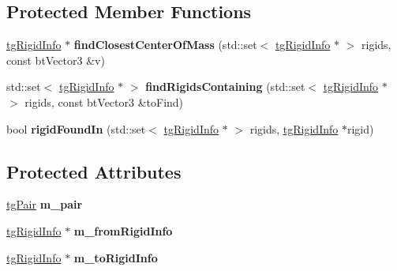 \subsection*{Protected Member Functions}
\begin{DoxyCompactItemize}
\item 
\hypertarget{classtg_connector_info_ae4cc2bb42c711b84030de8aa85c62914}{\hyperlink{classtg_rigid_info}{tg\-Rigid\-Info} $\ast$ {\bfseries find\-Closest\-Center\-Of\-Mass} (std\-::set$<$ \hyperlink{classtg_rigid_info}{tg\-Rigid\-Info} $\ast$ $>$ rigids, const bt\-Vector3 \&v)}\label{classtg_connector_info_ae4cc2bb42c711b84030de8aa85c62914}

\item 
\hypertarget{classtg_connector_info_a846dd3e81da5a535df56b1adcf1a22c4}{std\-::set$<$ \hyperlink{classtg_rigid_info}{tg\-Rigid\-Info} $\ast$ $>$ {\bfseries find\-Rigids\-Containing} (std\-::set$<$ \hyperlink{classtg_rigid_info}{tg\-Rigid\-Info} $\ast$ $>$ rigids, const bt\-Vector3 \&to\-Find)}\label{classtg_connector_info_a846dd3e81da5a535df56b1adcf1a22c4}

\item 
\hypertarget{classtg_connector_info_a5c509a7fa18968d5f2cd4e5d85fde970}{bool {\bfseries rigid\-Found\-In} (std\-::set$<$ \hyperlink{classtg_rigid_info}{tg\-Rigid\-Info} $\ast$ $>$ rigids, \hyperlink{classtg_rigid_info}{tg\-Rigid\-Info} $\ast$rigid)}\label{classtg_connector_info_a5c509a7fa18968d5f2cd4e5d85fde970}

\end{DoxyCompactItemize}
\subsection*{Protected Attributes}
\begin{DoxyCompactItemize}
\item 
\hypertarget{classtg_connector_info_a84094c60d574b1a4d433befeabf066d1}{\hyperlink{classtg_pair}{tg\-Pair} {\bfseries m\-\_\-pair}}\label{classtg_connector_info_a84094c60d574b1a4d433befeabf066d1}

\item 
\hypertarget{classtg_connector_info_a0c8d385df157b89a0dd6315e35c87d34}{\hyperlink{classtg_rigid_info}{tg\-Rigid\-Info} $\ast$ {\bfseries m\-\_\-from\-Rigid\-Info}}\label{classtg_connector_info_a0c8d385df157b89a0dd6315e35c87d34}

\item 
\hypertarget{classtg_connector_info_ad922a1bb8fee78fde29101489cc9ae09}{\hyperlink{classtg_rigid_info}{tg\-Rigid\-Info} $\ast$ {\bfseries m\-\_\-to\-Rigid\-Info}}\label{classtg_connector_info_ad922a1bb8fee78fde29101489cc9ae09}

\end{DoxyCompactItemize}


